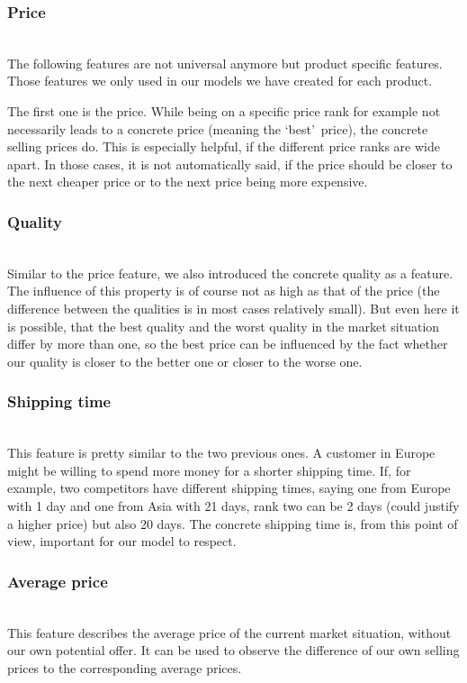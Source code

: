 	\subsubsection{Price}
		~\\
		The following features are not universal anymore but product specific features. Those features we only used in our models we have created for each product.

		The first one is the price. While being on a specific price rank for example not necessarily leads to a concrete price (meaning the \lq{best}\rq\ price), the concrete selling prices do. This is especially helpful, if the different price ranks are wide apart. In those cases, it is not automatically said, if the price should be closer to the next cheaper price or to the next price being more expensive.
	\subsubsection{Quality}
		~\\
		Similar to the price feature, we also introduced the concrete quality as a feature. The influence of this property is of course not as high as that of the price (the difference between the qualities is in most cases relatively small). But even here it is possible, that the best quality and the worst quality in the market situation differ by more than one, so the best price can be influenced by the fact whether our quality is closer to the better one or closer to the worse one.
	\subsubsection{Shipping time}
		~\\
		This feature is pretty similar to the two previous ones. A customer in Europe might be willing to spend more money for a shorter shipping time. If, for example, two competitors have different shipping times, saying one from Europe with 1 day and one from Asia with 21 days, rank two can be 2 days (could justify a higher price) but also 20 days. The concrete shipping time is, from this point of view, important for our model to respect.
	\subsubsection{Average price}
		~\\
		This feature describes the average price of the current market situation, without our own potential offer. It can be used to observe the difference of our own selling prices to the corresponding average prices.

